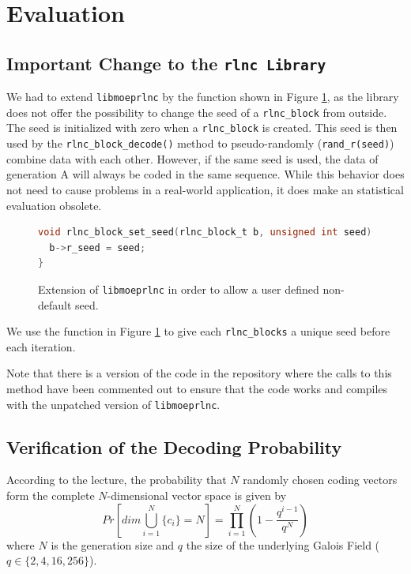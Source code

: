 \documentclass[a4paper,english,10pt]{tumarticle}
\begin{document}
\section{Evaluation}\label{sec:eval}
\subsection{Important Change to the \texttt{rlnc Library}}
We had to extend \texttt{libmoeprlnc} by the function shown in Figure \ref{code}, as the 
library does not offer the possibility to change the seed of a \texttt{rlnc\_block} from outside. The seed is 
initialized with zero when a \texttt{rlnc\_block} is created. This seed is then used by the \texttt{rlnc\_block\_decode()}
method to pseudo-randomly (\texttt{rand\_r(seed)}) combine data with each other. However, if the same seed is used, the 
data of generation A will always be coded in the same sequence. 
While this behavior does not need to cause problems in a real-world application, it does make an statistical evaluation obsolete.


\begin{figure}[h]
  \begin{lstlisting}[language=C]
void rlnc_block_set_seed(rlnc_block_t b, unsigned int seed){
  b->r_seed = seed;
}
\end{lstlisting}
  \caption[]{Extension of \texttt{libmoeprlnc} in order to allow a user defined non-default seed.}
  \label{code}
\end{figure}

We use the function in Figure \ref{code} to give each \texttt{rlnc\_blocks} a unique seed before each iteration.

Note that there is a version of the code in the repository where the calls to this method 
have been commented out to ensure that the code works and compiles with the unpatched version of \texttt{libmoeprlnc}.

\subsection{Verification of the Decoding Probability}
According to the lecture, the probability that $N$ randomly chosen coding vectors form
the complete $N$-dimensional vector space is given by %
\begin{equation} 
  Pr[dim\bigcup_{i=1}^{N}\{c_i\} = N] = \prod_{i=1}^{N} (1 - \frac{q^{i - 1}}{q ^ {N}})
  \label{eq:decode_prob}
\end{equation}
where $N$ is the generation size and $q$ the size of the underlying Galois Field ($q \in \{2,4,16,256\}$).
\end{document}
